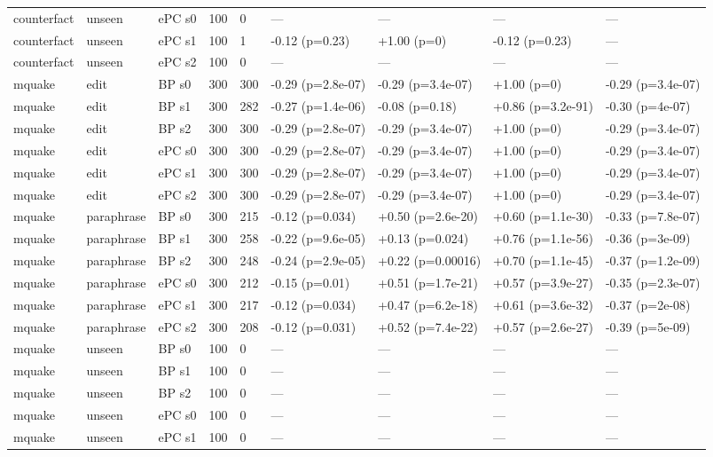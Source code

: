 \documentclass[10pt,a4paper]{article}
\begin{document}
\begin{center}
\begin{tabularx}{\textwidth}{@{}p{}XXXXXXXX@{}}
counterfact & unseen & ePC s0 & 100 & 0 & — & — & — & — \\
counterfact & unseen & ePC s1 & 100 & 1 & -0.12 (p=0.23) & +1.00 (p=0) & -0.12 (p=0.23) & — \\
counterfact & unseen & ePC s2 & 100 & 0 & — & — & — & — \\
mquake & edit & BP s0 & 300 & 300 & -0.29 (p=2.8e-07) & -0.29 (p=3.4e-07) & +1.00 (p=0) & -0.29 (p=3.4e-07) \\
mquake & edit & BP s1 & 300 & 282 & -0.27 (p=1.4e-06) & -0.08 (p=0.18) & +0.86 (p=3.2e-91) & -0.30 (p=4e-07) \\
mquake & edit & BP s2 & 300 & 300 & -0.29 (p=2.8e-07) & -0.29 (p=3.4e-07) & +1.00 (p=0) & -0.29 (p=3.4e-07) \\
mquake & edit & ePC s0 & 300 & 300 & -0.29 (p=2.8e-07) & -0.29 (p=3.4e-07) & +1.00 (p=0) & -0.29 (p=3.4e-07) \\
mquake & edit & ePC s1 & 300 & 300 & -0.29 (p=2.8e-07) & -0.29 (p=3.4e-07) & +1.00 (p=0) & -0.29 (p=3.4e-07) \\
mquake & edit & ePC s2 & 300 & 300 & -0.29 (p=2.8e-07) & -0.29 (p=3.4e-07) & +1.00 (p=0) & -0.29 (p=3.4e-07) \\
mquake & paraphrase & BP s0 & 300 & 215 & -0.12 (p=0.034) & +0.50 (p=2.6e-20) & +0.60 (p=1.1e-30) & -0.33 (p=7.8e-07) \\
mquake & paraphrase & BP s1 & 300 & 258 & -0.22 (p=9.6e-05) & +0.13 (p=0.024) & +0.76 (p=1.1e-56) & -0.36 (p=3e-09) \\
mquake & paraphrase & BP s2 & 300 & 248 & -0.24 (p=2.9e-05) & +0.22 (p=0.00016) & +0.70 (p=1.1e-45) & -0.37 (p=1.2e-09) \\
mquake & paraphrase & ePC s0 & 300 & 212 & -0.15 (p=0.01) & +0.51 (p=1.7e-21) & +0.57 (p=3.9e-27) & -0.35 (p=2.3e-07) \\
mquake & paraphrase & ePC s1 & 300 & 217 & -0.12 (p=0.034) & +0.47 (p=6.2e-18) & +0.61 (p=3.6e-32) & -0.37 (p=2e-08) \\
mquake & paraphrase & ePC s2 & 300 & 208 & -0.12 (p=0.031) & +0.52 (p=7.4e-22) & +0.57 (p=2.6e-27) & -0.39 (p=5e-09) \\
mquake & unseen & BP s0 & 100 & 0 & — & — & — & — \\
mquake & unseen & BP s1 & 100 & 0 & — & — & — & — \\
mquake & unseen & BP s2 & 100 & 0 & — & — & — & — \\
mquake & unseen & ePC s0 & 100 & 0 & — & — & — & — \\
mquake & unseen & ePC s1 & 100 & 0 & — & — & — & — \\

\end{tabularx}
\end{center}
\end{document}
